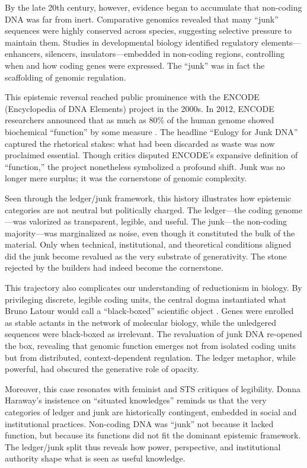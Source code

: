 \documentclass[12pt]{article}
\begin{document}
{{{By the late 20th century, however, evidence began to accumulate that non-coding DNA was far from inert. Comparative genomics revealed that many ``junk'' sequences were highly conserved across species, suggesting selective pressure to maintain them. Studies in developmental biology identified regulatory elements---enhancers, silencers, insulators---embedded in non-coding regions, controlling when and how coding genes were expressed. The ``junk'' was in fact the scaffolding of genomic regulation.

This epistemic reversal reached public prominence with the ENCODE (Encyclopedia of DNA Elements) project in the 2000s. In 2012, ENCODE researchers announced that as much as 80\% of the human genome showed biochemical ``function'' by some measure \citep{encode2012, pennisi2012}. The headline ``Eulogy for Junk DNA'' captured the rhetorical stakes: what had been discarded as waste was now proclaimed essential. Though critics disputed ENCODE’s expansive definition of ``function,'' the project nonetheless symbolized a profound shift. Junk was no longer mere surplus; it was the cornerstone of genomic complexity.

Seen through the ledger/junk framework, this history illustrates how epistemic categories are not neutral but politically charged. The ledger---the coding genome---was valorized as transparent, legible, and useful. The junk---the non-coding majority---was marginalized as noise, even though it constituted the bulk of the material. Only when technical, institutional, and theoretical conditions aligned did the junk become revalued as the very substrate of generativity. The stone rejected by the builders had indeed become the cornerstone.

This trajectory also complicates our understanding of reductionism in biology. By privileging discrete, legible coding units, the central dogma instantiated what Bruno Latour would call a ``black-boxed'' scientific object \citep{latour1987}. Genes were enrolled as stable actants in the network of molecular biology, while the unledgered sequences were black-boxed as irrelevant. The revaluation of junk DNA re-opened the box, revealing that genomic function emerges not from isolated coding units but from distributed, context-dependent regulation. The ledger metaphor, while powerful, had obscured the generative role of opacity.

Moreover, this case resonates with feminist and STS critiques of legibility. Donna Haraway’s insistence on ``situated knowledges'' \citep{haraway1988} reminds us that the very categories of ledger and junk are historically contingent, embedded in social and institutional practices. Non-coding DNA was ``junk'' not because it lacked function, but because its functions did not fit the dominant epistemic framework. The ledger/junk split thus reveals how power, perspective, and institutional authority shape what is seen as useful knowledge.

}}}
\end{document}
